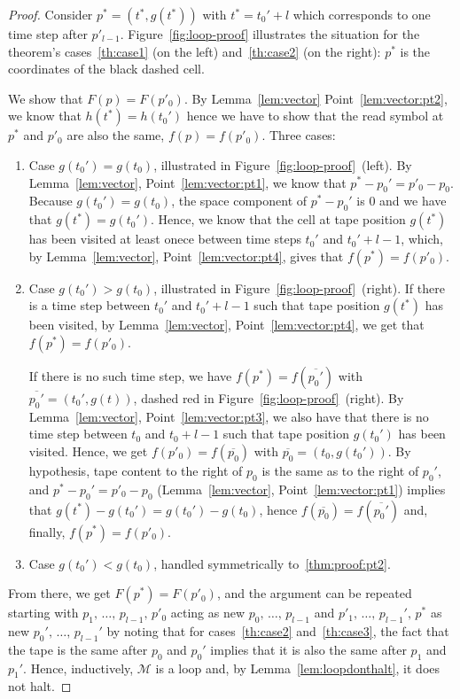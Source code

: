 \begin{proof}

    Consider $p^* = (t^*, g(t^*))$ with $t^*=t_0'+l$ which corresponds to one time step after $p'_{l-1}$. Figure~\ref{fig:loop-proof} illustrates the situation for the theorem's cases~\ref{th:case1} (on the left) and~\ref{th:case2} (on the right): $p^*$ is the coordinates of the black dashed cell.

    We show that $F(p) = F(p'_0)$. By Lemma~\ref{lem:vector} Point~\ref{lem:vector:pt2}, we know that $h(t^*) = h(t_0')$ hence we have to show that the read symbol at $p^*$ and $p'_0$ are also the same, \ie $f(p) = f(p'_0)$. Three cases:

    \begin{enumerate}
        \item Case $g(t_0') = g(t_0)$, illustrated in Figure~\ref{fig:loop-proof}~(left).  By Lemma~\ref{lem:vector}, Point~\ref{lem:vector:pt1}, we know that $p^*-p_0' = p'_0 - p_0$. Because $g(t_0') = g(t_0)$, the space component of $p^*-p_0'$ is 0 and we have that $g(t^*) = g(t_0')$. Hence, we know that the cell at tape position $g(t^*)$ has been visited at least onece between time steps $t_0'$ and $t_0'+l-1$, which, by Lemma~\ref{lem:vector}, Point~\ref{lem:vector:pt4}, gives that $f(p^*) = f(p'_0)$.

        \item Case $g(t_0') > g(t_0)$, illustrated in Figure~\ref{fig:loop-proof}~(right). If there is a time step between $t_0'$ and $t_0'+l-1$ such that tape position $g(t^*)$ has been visited, by Lemma~\ref{lem:vector}, Point~\ref{lem:vector:pt4}, we get that $f(p^*) = f(p'_0)$.

              If there is no such time step, we have $f(p^*) = f(\overline{p_0'})$ with $\overline{p_0'} = (t_0',g(t))$, dashed red in Figure~\ref{fig:loop-proof}~(right). By Lemma~\ref{lem:vector}, Point~\ref{lem:vector:pt3}, we also have that there is no time step between $t_0$ and $t_0+l-1$ such that tape position $g(t_0')$ has been visited. Hence, we  get $f(p'_0) = f(\overline{p_0})$ with $\overline{p_0} = (t_0,g(t_0'))$. By hypothesis, tape content to the right of $p_0$ is the same as to the right of $p_0'$, and $p^*-p_0' = p'_0 - p_0$ (Lemma~\ref{lem:vector}, Point~\ref{lem:vector:pt1}) implies that $g(t^*)-g(t_0') = g(t_0') - g(t_0)$, hence $f(\overline{p_0}) = f(\overline{p_0'})$ and, finally, $f(p^*) = f(p'_0)$.\label{thm:proof:pt2}
        \item Case $g(t_0') < g(t_0)$, handled symmetrically to~\ref{thm:proof:pt2}.
    \end{enumerate}
    From there, we get $F(p^*) = F(p'_0)$, and the argument can be repeated starting with $p_1,\, \dots,\, p_{l-1},\, p'_0$ acting as new $p_0,\,\dots,\,p_{l-1}$ and $p'_1,\, \dots,\, p_{l-1}',\, p^*$ as new $p_0',\,\dots,\,p_{l-1}'$ by noting that for cases~\ref{th:case2} and~\ref{th:case3}, the fact that the tape is the same after $p_0$ and $p_0'$ implies that it is also the same after $p_1$ and $p_1'$. Hence, inductively, $\mathcal{M}$ is a loop and, by Lemma~\ref{lem:loopdonthalt}, it does not halt.
\end{proof}

